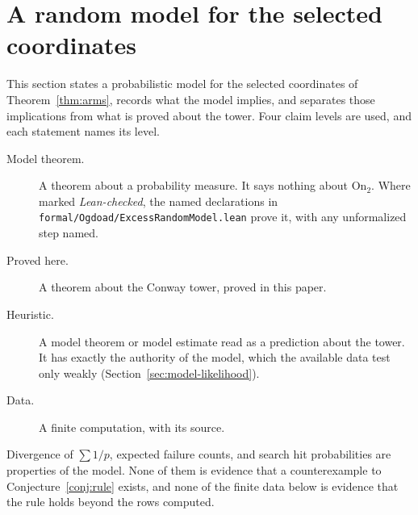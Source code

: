 %

\section{A random model for the selected coordinates}\label{sec:model}

This section states a probabilistic model for the selected coordinates of
Theorem~\ref{thm:arms}, records what the model implies, and separates those
implications from what is proved about the tower.  Four claim levels are
used, and each statement names its level.
\begin{description}
\item[Model theorem.] A theorem about a probability measure.  It says
      nothing about $\mathrm{On}_2$.  Where marked \emph{Lean-checked}, the
      named declarations in \texttt{formal/Ogdoad/ExcessRandomModel.lean}
      prove it, with any unformalized step named.
\item[Proved here.] A theorem about the Conway tower, proved in this paper.
\item[Heuristic.] A model theorem or model estimate read as a prediction
      about the tower.  It has exactly the authority of the model, which the
      available data test only weakly (Section~\ref{sec:model-likelihood}).
\item[Data.] A finite computation, with its source.
\end{description}
Divergence of $\sum1/p$, expected failure counts, and search hit
probabilities are properties of the model.  None of them is evidence that a
counterexample to Conjecture~\ref{conj:rule} exists, and none of the finite
data below is evidence that the rule holds beyond the rows computed.

